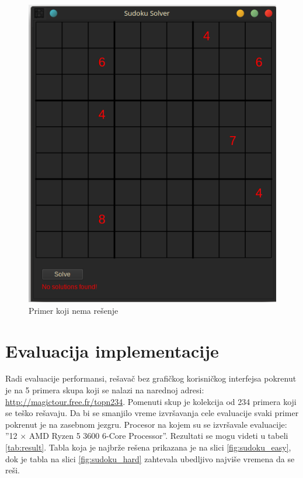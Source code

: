 \documentclass[a4paper]{article}
\begin{document}
{\begin{figure}[h!]
\begin{minipage}{0.45\textwidth}
      \includegraphics[width=\linewidth]{slike/app_error.png}
      \caption{Primer koji nema rešenje}
      \label{fig:app_error}
  \end{minipage}
\end{figure}


\section{Evaluacija implementacije}

Radi evaluacije performansi, rešavač bez grafičkog korisničkog interfejsa pokrenut je na 5 primera skupa koji se
nalazi na narednoj adresi: \url{http://magictour.free.fr/topn234}. Pomenuti skup je kolekcija od 234 primera koji se teško rešavaju.
Da bi se smanjilo vreme izvršavanja cele evaluacije svaki primer pokrenut je na zasebnom jezgru.
Procesor na kojem su se izvršavale evaluacije: ''12 × AMD Ryzen 5 3600 6-Core Processor''.
Rezultati se mogu videti u tabeli \ref{tab:result}. Tabla koja je najbrže rešena prikazana je na slici \ref{fig:sudoku_easy}, dok je tabla na slici \ref{fig:sudoku_hard}
zahtevala ubedljivo najviše vremena da se reši.

}
\end{document}
